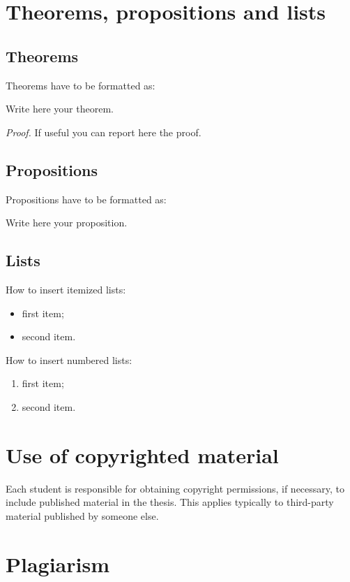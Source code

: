 \documentclass{config/PoliMi3i_thesis}
\begin{document}
\section{Theorems, propositions and lists}

\subsection{Theorems}
Theorems have to be formatted as:
\begin{theorem}
    \label{a_theorem}
    Write here your theorem.
\end{theorem}
\textit{Proof.} If useful you can report here the proof.

\subsection{Propositions}
Propositions have to be formatted as:
\begin{proposition}
    Write here your proposition.
\end{proposition}

\subsection{Lists}
How to  insert itemized lists:
\begin{itemize}
    \item first item;
    \item second item.
\end{itemize}
How to insert numbered lists:
\begin{enumerate}
    \item first item;
    \item second item.
\end{enumerate}

\section{Use of copyrighted material}

Each student is responsible for obtaining copyright permissions, if necessary, to include published material in the thesis.
This applies typically to third-party material published by someone else.

\section{Plagiarism}
\end{document}
